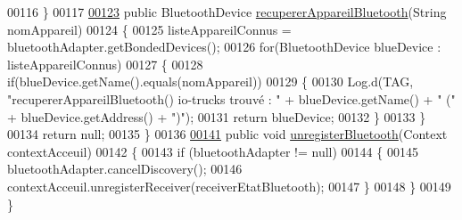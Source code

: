 \begin{DoxyCode}
00116     \}
00117 
\hyperlink{classcom_1_1lasalle_1_1io__trucks_1_1_communication_a84ae8043b94d6f156a30f6f90dbbba4e}{00123}     \textcolor{keyword}{public} BluetoothDevice \hyperlink{classcom_1_1lasalle_1_1io__trucks_1_1_communication_a84ae8043b94d6f156a30f6f90dbbba4e}{recupererAppareilBluetooth}(String nomAppareil)
00124     \{
00125         listeAppareilConnus = bluetoothAdapter.getBondedDevices();
00126         \textcolor{keywordflow}{for}(BluetoothDevice blueDevice : listeAppareilConnus)
00127         \{
00128             \textcolor{keywordflow}{if}(blueDevice.getName().equals(nomAppareil))
00129             \{
00130                 Log.d(TAG, \textcolor{stringliteral}{"recupererAppareilBluetooth() io-trucks trouvé : "} + blueDevice.getName() + \textcolor{stringliteral}{" ("}
       + blueDevice.getAddress() + \textcolor{stringliteral}{")"});
00131                 \textcolor{keywordflow}{return} blueDevice;
00132             \}
00133         \}
00134         \textcolor{keywordflow}{return} null;
00135     \}
00136 
\hyperlink{classcom_1_1lasalle_1_1io__trucks_1_1_communication_ad5df5cc22c05d1a2af2b2c0adde57dea}{00141}     \textcolor{keyword}{public} \textcolor{keywordtype}{void} \hyperlink{classcom_1_1lasalle_1_1io__trucks_1_1_communication_ad5df5cc22c05d1a2af2b2c0adde57dea}{unregisterBluetooth}(Context contextAcceuil)
00142     \{
00143         \textcolor{keywordflow}{if} (bluetoothAdapter != null)
00144         \{
00145             bluetoothAdapter.cancelDiscovery();
00146             contextAcceuil.unregisterReceiver(receiverEtatBluetooth);
00147         \}
00148     \}
00149 \}
\end{DoxyCode}
